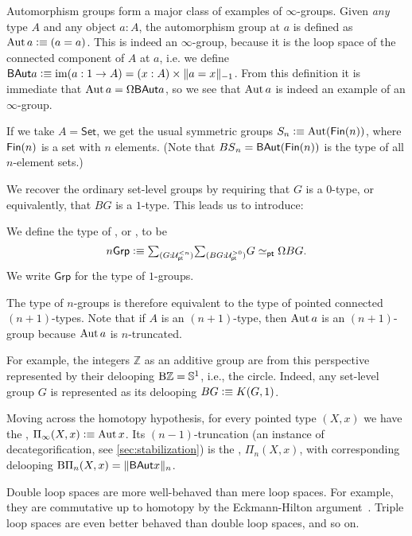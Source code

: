 Automorphism groups form a major class of examples of $\infty$-groups.
Given \emph{any} type $A$ and any object $a : A$, the automorphism group at $a$ is defined as
 $\Aut a\defeq (a=a)$. 
This is indeed an $\infty$-group, because it is the loop space of the connected component of $A$ at $a$, i.e. we define~$\BAut a \defeq  \im(a : 1 \to A) = (x : A) \times \trunc{-1}{a=x}$.
From this definition it is immediate that $\Aut a=\loopspacesym\BAut a$, so we see that $\Aut a$ is indeed an example of an $\infty$-group. 

If we take $A = \mathsf{Set}$, we get the usual symmetric groups
$\Sym_n \defeq  \Aut(\Fin(n))$, where $\Fin(n)$ is a set with $n$
elements. (Note that $\BS_n = \BAut(\Fin (n))$ is the type of all
$n$-element sets.)

We recover the ordinary set-level groups by requiring that $G$ is a $0$-type, or equivalently, that $BG$
is a $1$-type. This leads us to introduce:

\begin{defn}
We define the type of , or , to be
\begin{equation*}
n\mathsf{Grp} \defeq \sm{G:\UU_\pt^{<n}}{BG :\UU_\pt^{>0}} G \eqvsym_\pt \loopspacesym BG.
\end{equation*}
We write $\mathsf{Grp}$ for the type of $1$-groups.
\end{defn}

The type of $n$-groups is therefore equivalent to the type of pointed connected $(n+1)$-types. Note that if $A$ is an $(n+1)$-type, then $\Aut a$ is an $(n+1)$-group because $\Aut a$ is $n$-truncated.

For example, the integers $\mathbb{Z}$ as an additive group are from this
perspective represented by their delooping $\mathop{\mathrm{B}\mathbb{Z}}=\bS^1$, i.e., the circle.
Indeed, any set-level group $G$ is represented as its delooping $BG\defeq K(G,1)$.

Moving across the homotopy hypothesis, for every pointed type $(X,x)$
we have the ,
$\Pi_\infty(X,x)\defeq \Aut x$. Its $(n-1)$-truncation (an instance of
decategorification, see \cref{sec:stabilization}) is the
, $\Pi_n(X,x)$,
with corresponding delooping $\mathrm{B}\Pi_n(X,x) = \trunc{n}{\BAut x}$.

Double loop spaces are more well-behaved than mere loop
spaces. For example, they are commutative up to homotopy
by the Eckmann-Hilton argument~\cite[Theorem~2.1.6]{hottbook}.
Triple loop spaces are even better behaved than double loop spaces, and so on.

